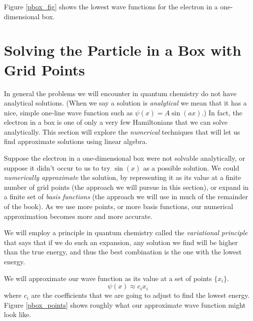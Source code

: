 Figure \ref{pbox_fig} shows the lowest wave functions for the electron
in a one-dimensional box.

\section{Solving the Particle in a Box with Grid Points}
In general the problems we will encounter in quantum chemistry do not
have analytical solutions. (When we say a solution is
\emph{analytical} we mean that it has a nice, simple one-line wave
function such as $\psi(x) = A\sin(ax)$.) In fact, the electron in a
box is one of only a very few Hamiltonians that we can solve
analytically. This section will explore the \emph{numerical}
techniques that will let us find approximate solutions using linear
algebra.

Suppose the electron in a one-dimensional box were not solvable
analytically, or suppose it didn't occur to us to try $\sin(x)$ as a
possible solution. We could \emph{numerically approximate} the
solution, by representing it as its value at a finite number of grid
points (the approach we will pursue in this section), or expand in a
finite set of \emph{basis functions} (the approach we will use in much
of the remainder of the book). As we use more points, or more basis
functions, our numerical approximation becomes more and more accurate.

We will employ a principle in quantum chemistry
called the \emph{variational principle} that says that if we do such
an expansion, any solution we find will be higher than the true
energy, and thus the best combination is the one with the lowest
energy. 

We will approximate our wave function as its value at a set of points
$\{x_i\}$. 
\begin{equation}
	\psi(x) \approx c_i x_i
\end{equation}
where $c_i$ are the coefficients that we are going to
adjust to find the lowest energy. Figure \ref{pbox_points}
shows roughly what our approximate wave function might look like.

